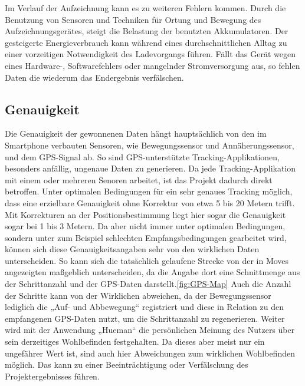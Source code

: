 Im Verlauf der Aufzeichnung kann es zu weiteren Fehlern kommen.
Durch die Benutzung von Sensoren und Techniken für Ortung und Bewegung des Aufzeichnungsgerätes, steigt die Belastung der benutzten Akkumulatoren.
Der gesteigerte Energieverbrauch kann während eines durchschnittlichen Alltag zu einer vorzeitigen Notwendigkeit des Ladevorgangs führen.
Fällt das Gerät wegen eines Hardware-, Softwarefehlers oder mangelnder Stromversorgung aus, so fehlen Daten die wiederum das Endergebnis verfälschen.

\subsection{Genauigkeit}
\label{ch:Relativierung:sec:SystematischeUndZufälligeFehler:subsec:Genauigkeit}

Die Genauigkeit der gewonnenen Daten hängt hauptsächlich von den im Smartphone verbauten Sensoren, wie Bewegungssensor und Annäherungssensor, und  dem GPS-Signal ab.
So sind GPS-unterstützte Tracking-Applikationen, besonders  anfällig, ungenaue Daten zu generieren.
Da jede Tracking-Applikation mit einem oder mehreren Senoren arbeitet, ist das Projekt dadurch direkt betroffen. 
Unter optimalen Bedingungen für ein sehr genaues Tracking möglich, dass eine erzielbare Genauigkeit ohne Korrektur von etwa 5 bis 20 Metern trifft. 
Mit Korrekturen an der Positionsbestimmung liegt hier sogar die Genauigkeit sogar bei 1 bis 3 Metern.
Da aber nicht immer unter optimalen Bedingungen, sondern unter zum Beispiel schlechten Empfangsbedingungen gearbeitet wird, können sich diese Genauigkeitsangaben sehr von den wirklichen Daten unterscheiden.  
So kann sich die tatsächlich gelaufene Strecke von der in Moves angezeigten maßgeblich unterscheiden, da die Angabe dort eine Schnittmenge aus der Schrittanzahl und der GPS-Daten darstellt.\ref{fig:GPS-Map}
Auch die Anzahl der Schritte kann von der Wirklichen abweichen, da der Bewegungssensor lediglich die „Auf- und Abbewegung“ registriert und diese in Relation zu den empfangenen GPS-Daten nutzt, um die Schrittanzahl zu regenerieren.
Weiter wird mit der Anwendung „Hueman“ die persönlichen Meinung des Nutzers über sein derzeitiges Wohlbefinden festgehalten. 
Da dieses aber meist nur ein ungefährer Wert ist, sind auch hier Abweichungen zum wirklichen Wohlbefinden möglich.
Das kann zu einer Beeinträchtigung oder Verfälschung des Projektergebnisses führen.



